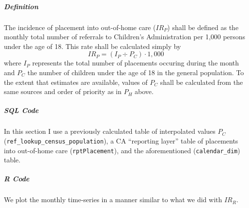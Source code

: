 \documentclass[12pt]{article}\usepackage[]{graphicx}\usepackage[]{color}
\begin{document}
\subparagraph{Definition} The incidence of placement into out-of-home care ($IR_P$) shall be defined as the monthly total number of referrals to Children's Administration per 1,000 persons under the age of 18. This rate shall be calculated simply by 
\begin{equation}\label{eq:IRP}
IR_P = (I_P \div P_C) \cdot 1,000
\end{equation}
where $I_P$ represents the total number of placements occuring during the month and $P_C$ the number of children under the age of 18 in the general population. To the extent that estimates are available, values of $P_C$ shall be calculated from the same sources and order of priority as in $P_H$ above.

\subparagraph{SQL Code}

In this section I use a previously calculated table of interpolated values $P_C$ (\texttt{ref\_lookup\_census\_population}), a CA ``reporting layer'' table of placements into out-of-home care (\texttt{rptPlacement}), and the aforementioned (\texttt{calendar\_dim}) table.




\subparagraph{R Code}

We plot the monthly time-series in a manner similar to what we did with $IR_R$.  
\end{document}
